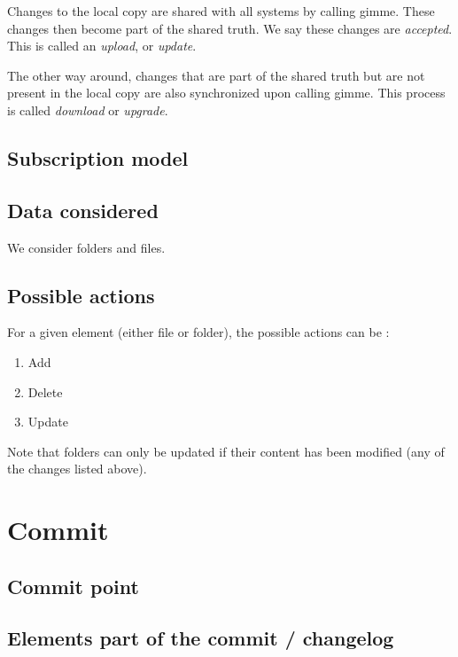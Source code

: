 \documentclass[10pt,a4paper]{article}
\newcommand{\gimme}{\textsf{gimme}}
\begin{document}
Changes to the local copy are shared with all systems by calling \gimme. These changes then become part of the shared truth. We say these changes are \textit{accepted}. This is called an \textit{upload}, or \textit{update}.

The other way around, changes that are part of the shared truth but are not present in the local copy are also synchronized upon calling \gimme. This process is called \textit{download} or \textit{upgrade}.

\subsection{Subscription model}

\subsection{Data considered}

We consider folders and files.

\subsection{Possible actions}

For a given element (either file or folder), the possible actions can be :
\begin{enumerate}
\item Add
\item Delete
\item Update
\end{enumerate}

Note that folders can only be updated if their content has been modified (any of the changes listed above).

\section{Commit}

\subsection{Commit point}

\subsection{Elements part of the commit / changelog}
\end{document}
